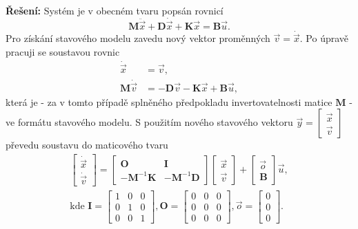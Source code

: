 \documentclass[twoside]{article}
\begin{document}
\textbf{Řešení:}
Systém je v obecném tvaru popsán rovnicí
\begin{equation}
	\mathbf{M} \ddot{\vec{x}} + \mathbf{D} \dot{\vec{x}} + \mathbf{K} \vec{x} = \mathbf{B} \vec{u}.
\end{equation}
Pro získání stavového modelu zavedu nový vektor proměnných $\vec{v} = \dot{\vec{x}}$. Po úpravě pracuji se soustavou rovnic
\begin{equation}
	\begin{split}
		\dot{\vec{x}} &= \vec{v}, \\
		\mathbf{M}\dot{\vec{v}} &= - \mathbf{D} \vec{v} - \mathbf{K} \vec{x} + \mathbf{B} \vec{u},
	\end{split}
\end{equation}
která je - za v tomto případě splněného předpokladu invertovatelnosti matice $\mathbf{M}$ - ve formátu stavového modelu. S použitím nového stavového vektoru $\vec{y} = \begin{bmatrix}
	\vec{x} \\ \vec{v}
\end{bmatrix}$ převedu soustavu do maticového tvaru
\begin{equation}
	\begin{split}
		\begin{bmatrix}
			\dot{\vec{x}} \\ \dot{\vec{v}}
		\end{bmatrix} = \begin{bmatrix}
			\mathbf{O} & \mathbf{I} \\
			- \mathbf{M}^{-1} \mathbf{K} & - \mathbf{M}^{-1} \mathbf{D}		
		\end{bmatrix} 	\begin{bmatrix}
			\vec{x} \\ \vec{v}
		\end{bmatrix} + \begin{bmatrix}
			\vec{o} \\ \mathbf{B}
		\end{bmatrix} \vec{u}, \\
		\text{kde } \mathbf{I} = \begin{bmatrix}
			1&0&0\\
			0&1&0\\
			0&0&1
		\end{bmatrix}, \mathbf{O} = \begin{bmatrix}
			0&0&0\\
			0&0&0\\
			0&0&0
		\end{bmatrix}, \vec{o} = \begin{bmatrix}
			0\\0\\0
		\end{bmatrix}.
	\end{split}
\end{equation}
\end{document}
